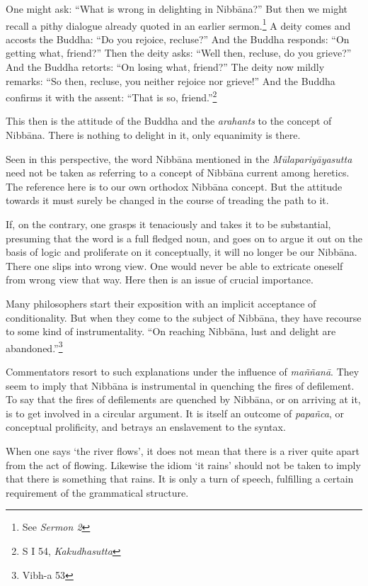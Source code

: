 One might ask: ``What is wrong in delighting in Nibbāna?'' But then we might recall a pithy dialogue already quoted in an earlier sermon.\footnote{See \emph{Sermon 2}} A deity comes and accosts the Buddha: ``Do you rejoice, recluse?'' And the Buddha responds: ``On getting what, friend?'' Then the deity asks: ``Well then, recluse, do you grieve?'' And the Buddha retorts: ``On losing what, friend?'' The deity now mildly remarks: ``So then, recluse, you neither rejoice nor grieve!'' And the Buddha confirms it with the assent: ``That is so, friend.''\footnote{S I 54, \emph{Kakudhasutta}}

This then is the attitude of the Buddha and the \emph{arahants} to the concept of Nibbāna. There is nothing to delight in it, only equanimity is there.

Seen in this perspective, the word Nibbāna mentioned in the \emph{Mūlapariyāyasutta} need not be taken as referring to a concept of Nibbāna current among heretics. The reference here is to our own orthodox Nibbāna concept. But the attitude towards it must surely be changed in the course of treading the path to it.

If, on the contrary, one grasps it tenaciously and takes it to be substantial, presuming that the word is a full fledged noun, and goes on to argue it out on the basis of logic and proliferate on it conceptually, it will no longer be our Nibbāna. There one slips into wrong view. One would never be able to extricate oneself from wrong view that way. Here then is an issue of crucial importance.

Many philosophers start their exposition with an implicit acceptance of conditionality. But when they come to the subject of Nibbāna, they have recourse to some kind of instrumentality. ``On reaching Nibbāna, lust and delight are abandoned.''\footnote{Vibh-a 53}

Commentators resort to such explanations under the influence of \emph{maññanā}. They seem to imply that Nibbāna is instrumental in quenching the fires of defilement. To say that the fires of defilements are quenched by Nibbāna, or on arriving at it, is to get involved in a circular argument. It is itself an outcome of \emph{papañca}, or conceptual prolificity, and betrays an enslavement to the syntax.

When one says `the river flows', it does not mean that there is a river quite apart from the act of flowing. Likewise the idiom `it rains' should not be taken to imply that there is something that rains. It is only a turn of speech, fulfilling a certain requirement of the grammatical structure.

